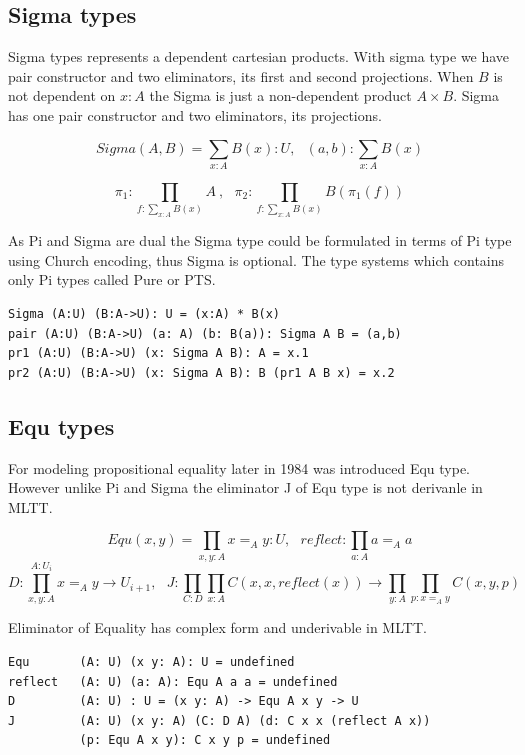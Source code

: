 \documentclass{svproc}
\begin{document}
\subsection{Sigma types}

Sigma types represents a dependent cartesian products.
With sigma type we have pair constructor and two eliminators,
its first and second projections. When $B$ is not dependent on $x:A$
the Sigma is just a non-dependent product $A \times B$.
Sigma has one pair constructor and two eliminators, its projections.

$$Sigma(A,B) = \sum_{x:A} B(x) : U,\ \ \ 
  (a,b) : \sum_{x:A} B(x)$$

$$\pi_1 : \prod_{f:\sum_{x:A}B(x)}A\ ,\ \ \ \pi_2 : \prod_{f:\sum_{x:A}B(x)}B(\pi_1(f))$$

As Pi and Sigma are dual the Sigma type could be formulated
in terms of Pi type using Church encoding, thus Sigma is optional.
The type systems which contains only Pi types called Pure or PTS.

\begin{lstlisting}[mathescape=true]
Sigma (A:U) (B:A->U): U = (x:A) * B(x)
pair (A:U) (B:A->U) (a: A) (b: B(a)): Sigma A B = (a,b)
pr1 (A:U) (B:A->U) (x: Sigma A B): A = x.1
pr2 (A:U) (B:A->U) (x: Sigma A B): B (pr1 A B x) = x.2
\end{lstlisting}

\newpage
\subsection{Equ types}

For modeling propositional equality later in 1984 was introduced Equ type.
However unlike Pi and Sigma the eliminator J of Equ type is not derivanle in MLTT.

$$Equ(x,y) = \prod_{x,y:A} x =_A y : U,\ \ \ 
  reflect : \prod_{a:A} a =_A a$$
$$D : \prod_{x,y:A}^{A:U_i} x =_A y \rightarrow U_{i+1},\ \ \ 
  J : \prod_{C: D} \prod_{x:A} C(x,x,reflect(x)) \rightarrow \prod_{y:A} \prod_{p:x=_A y} C(x,y,p)$$

Eliminator of Equality has complex form and underivable in MLTT.

\begin{lstlisting}[mathescape=true]
Equ       (A: U) (x y: A): U = undefined
reflect   (A: U) (a: A): Equ A a a = undefined
D         (A: U) : U = (x y: A) -> Equ A x y -> U
J         (A: U) (x y: A) (C: D A) (d: C x x (reflect A x))
          (p: Equ A x y): C x y p = undefined
\end{lstlisting}
\end{document}
